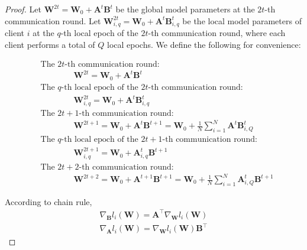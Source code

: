 \begin{proof}
    Let $\mathbf{W}^{2t} = \mathbf{W}_0 + \mathbf{A}^t\mathbf{B}^t$ be the global model parameters at the $2t$-th communication round. Let $\mathbf{W}_{i,q}^{2t} = \mathbf{W}_0 + \mathbf{A}^t\mathbf{B}_{i,q}^t$ be the local model parameters of client $i$ at the $q$-th local epoch of the $2t$-th communication round, where each client performs a total of $Q$ local epochs. We define the following for convenience:

    \begin{align}
       & \text{The $2t$-th communication round:} \nonumber\\ &\quad \quad \quad \quad \mathbf{W}^{2t} = \mathbf{W}_0 + \mathbf{A}^t\mathbf{B}^t \label{w-2t}\\
        &\text{The $q$-th local epoch of the $2t$-th communication round:} \nonumber \\
        &\quad \quad \quad \quad  \mathbf{W}_{i,q}^{2t} = \mathbf{W}_0 + \mathbf{A}^t\mathbf{B}_{i,q}^t \label{w-2t-q} \\
        &\text{The $2t+1$-th communication round:} \nonumber \\
        &\quad \quad \quad \quad  \mathbf{W}^{2t+1} = \mathbf{W}_0 + \mathbf{A}^t\mathbf{B}^{t+1}    =   \mathbf{W}_0 + \frac{1}{N}\sum_{i=1}^{N}\mathbf{A}^t\mathbf{B}_{i,Q}^{t} \label{w-2t+1} \\
        &\text{The $q$-th local epoch of the $2t+1$-th communication round:} \nonumber \\
         &\quad \quad \quad \quad  \mathbf{W}_{i,q}^{2t+1} = \mathbf{W}_0 + \mathbf{A}_{i,q}^t\mathbf{B}^{t+1} \label{w-2t+1-q} \\
         &\text{The $2t+2$-th communication round:} \nonumber \\
         &\quad \quad \quad \quad  \mathbf{W}^{2t+2} =  \mathbf{W}_0 + \mathbf{A}^{t+1}\mathbf{B}^{t+1} = \mathbf{W}_0 + \frac{1}{N}\sum_{i=1}^{N}\mathbf{A}_{i,Q}^t\mathbf{B}^{t+1}\label{w-2t+2}  
    \end{align}

    According to chain rule, 
    \begin{align}
       \nabla_{\mathbf{B}} l_i(\mathbf{W}) =  \mathbf{A}^\top \nabla_{\mathbf{W}} l_i(\mathbf{W}) \\
       \nabla_{\mathbf{A}} l_i(\mathbf{W}) =  \nabla_{\mathbf{W}} l_i(\mathbf{W})\mathbf{B}^\top
    \end{align}


\end{proof}
